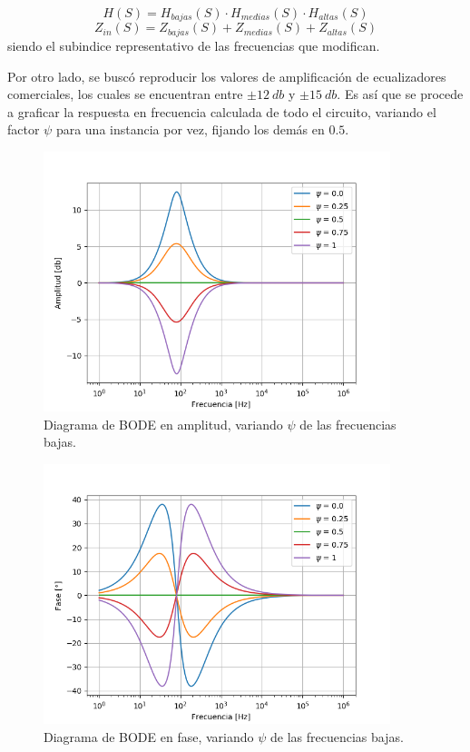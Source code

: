 \documentclass[a4paper]{article}
\begin{document}
\begin{equation}
	H(S) = H_{bajas}(S) \cdot H_{medias}(S) \cdot H_{altas}(S)
\end{equation}
\begin{equation}
	Z_{in}(S) = Z_{bajas}(S) + Z_{medias}(S) + Z_{altas}(S)
\end{equation}
siendo el subindice representativo de las frecuencias que modifican.

Por otro lado, se buscó reproducir los valores de amplificación de ecualizadores comerciales, los cuales se encuentran entre $\pm 12 \ db$ y $\pm 15 \ db$. Es así que se procede a graficar la respuesta en frecuencia calculada de todo el circuito, variando el factor $\psi$ para una instancia por vez, fijando los demás en $0.5$.
\begin{figure}[H]
\centering
	\includegraphics[width=0.9\textwidth]{Imagenes/Low-psi-bode.png}
	\caption{Diagrama de BODE en amplitud, variando $\psi$ de las frecuencias bajas.}
	\label{fig:bode_modulo_low}
\end{figure}
\begin{figure}[H]
\centering
	\includegraphics[width=0.9\textwidth]{Imagenes/Low-psi-ph.png}
	\caption{Diagrama de BODE en fase, variando $\psi$ de las frecuencias bajas.}
	\label{fig:bode_ph_low}
\end{figure}
\end{document}
